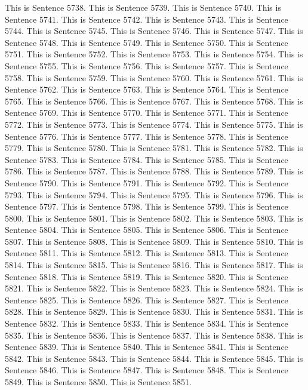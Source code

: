 \documentclass{article}
\begin{document}
This is Sentence 5738.
This is Sentence 5739.
This is Sentence 5740.
This is Sentence 5741.
This is Sentence 5742.
This is Sentence 5743.
This is Sentence 5744.
This is Sentence 5745.
This is Sentence 5746.
This is Sentence 5747.
This is Sentence 5748.
This is Sentence 5749.
This is Sentence 5750.
This is Sentence 5751.
This is Sentence 5752.
This is Sentence 5753.
This is Sentence 5754.
This is Sentence 5755.
This is Sentence 5756.
This is Sentence 5757.
This is Sentence 5758.
This is Sentence 5759.
This is Sentence 5760.
This is Sentence 5761.
This is Sentence 5762.
This is Sentence 5763.
This is Sentence 5764.
This is Sentence 5765.
This is Sentence 5766.
This is Sentence 5767.
This is Sentence 5768.
This is Sentence 5769.
This is Sentence 5770.
This is Sentence 5771.
This is Sentence 5772.
This is Sentence 5773.
This is Sentence 5774.
This is Sentence 5775.
This is Sentence 5776.
This is Sentence 5777.
This is Sentence 5778.
This is Sentence 5779.
This is Sentence 5780.
This is Sentence 5781.
This is Sentence 5782.
This is Sentence 5783.
This is Sentence 5784.
This is Sentence 5785.
This is Sentence 5786.
This is Sentence 5787.
This is Sentence 5788.
This is Sentence 5789.
This is Sentence 5790.
This is Sentence 5791.
This is Sentence 5792.
This is Sentence 5793.
This is Sentence 5794.
This is Sentence 5795.
This is Sentence 5796.
This is Sentence 5797.
This is Sentence 5798.
This is Sentence 5799.
This is Sentence 5800.
This is Sentence 5801.
This is Sentence 5802.
This is Sentence 5803.
This is Sentence 5804.
This is Sentence 5805.
This is Sentence 5806.
This is Sentence 5807.
This is Sentence 5808.
This is Sentence 5809.
This is Sentence 5810.
This is Sentence 5811.
This is Sentence 5812.
This is Sentence 5813.
This is Sentence 5814.
This is Sentence 5815.
This is Sentence 5816.
This is Sentence 5817.
This is Sentence 5818.
This is Sentence 5819.
This is Sentence 5820.
This is Sentence 5821.
This is Sentence 5822.
This is Sentence 5823.
This is Sentence 5824.
This is Sentence 5825.
This is Sentence 5826.
This is Sentence 5827.
This is Sentence 5828.
This is Sentence 5829.
This is Sentence 5830.
This is Sentence 5831.
This is Sentence 5832.
This is Sentence 5833.
This is Sentence 5834.
This is Sentence 5835.
This is Sentence 5836.
This is Sentence 5837.
This is Sentence 5838.
This is Sentence 5839.
This is Sentence 5840.
This is Sentence 5841.
This is Sentence 5842.
This is Sentence 5843.
This is Sentence 5844.
This is Sentence 5845.
This is Sentence 5846.
This is Sentence 5847.
This is Sentence 5848.
This is Sentence 5849.
This is Sentence 5850.
This is Sentence 5851.
\end{document}
